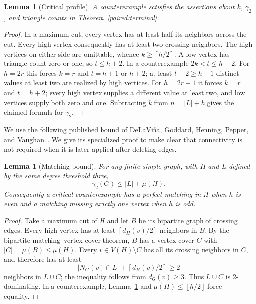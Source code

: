 \documentclass[11pt,a4paper]{article}
\newtheorem{lemma}[theorem]{Lemma}
\theoremstyle{definition}\newtheorem{definition}[theorem]{Definition}
\theoremstyle{remark}\newtheorem{remark}[theorem]{Remark}
\newcommand{\ceil}[1]{\left\lceil#1\right\rceil}
\newcommand{\floor}[1]{\left\lfloor#1\right\rfloor}
\begin{document}
\begin{lemma}[Critical profile]\label{paired:critical}
A counterexample satisfies the assertions about $k$, $\gamma_2$, and
triangle counts in Theorem~\ref{paired:terminal}.
\end{lemma}
\begin{proof}
In a maximum cut, every vertex has at least half its neighbors across
the cut. Every high vertex consequently has at least two crossing
neighbors. The high vertices on either side are omittable, whence
$k\ge\ceil{h/2}$. A low vertex has triangle count zero or one, so
$t\le h+2$. In a counterexample $2k<t\le h+2$. For $h=2r$ this forces
$k=r$ and $t=h+1$ or $h+2$; at least $t-2\ge h-1$ distinct values
at least two are realized by high vertices. For $h=2r-1$ it forces
$k=r$ and $t=h+2$; every high vertex supplies a different value at
least two, and low vertices supply both zero and one. Subtracting $k$
from $n=|L|+h$ gives the claimed formula for $\gamma_2$.
\end{proof}

We use the following published bound of DeLaVi\~na, Goddard, Henning,
Pepper, and Vaughan~\cite[Theorem 3]{paired:DGH}. We give its specialized
proof to make clear that connectivity is not required when it is later
applied after deleting edges.

\begin{lemma}[Matching bound]\label{paired:matching-bound}
For any finite simple graph, with $H$ and $L$ defined by the same degree
threshold three,
\begin{equation}\label{paired:matching-ineq}
 \gamma_2(G)\le |L|+\mu(H).
\end{equation}
Consequently a critical counterexample has a perfect matching in $H$
when $h$ is even and a matching missing exactly one vertex when $h$ is odd.
\end{lemma}
\begin{proof}
Take a maximum cut of $H$ and let $B$ be its bipartite graph of crossing
edges. Every high vertex has at least $\ceil{d_H(v)/2}$ neighbors in $B$.
By the bipartite matching--vertex-cover theorem, $B$ has a vertex cover
$C$ with $|C|=\mu(B)\le\mu(H)$. Every $v\in V(H)\setminus C$ has all
its crossing neighbors in $C$, and therefore has at least
\[
 |N_G(v)\cap L|+\ceil{d_H(v)/2}\ge2
\]
neighbors in $L\cup C$; the inequality follows from $d_G(v)\ge3$.
Thus $L\cup C$ is 2-dominating. In a counterexample,
Lemma~\ref{paired:critical} and $\mu(H)\le\floor{h/2}$ force equality.
\end{proof}
\end{document}
